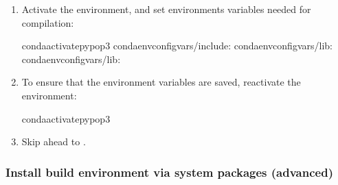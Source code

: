 \documentclass[letterpaper,10pt,english,openany,oneside]{sphinxmanual}
\begin{document}
\begin{enumerate}
\item {} 
\sphinxAtStartPar
Activate the environment, and set environments variables needed for
compilation:

\begin{sphinxVerbatim}[commandchars=\\\{\}]
condaactivatepypop3
condaenvconfigvars/include:
condaenvconfigvars/lib:
condaenvconfigvars/lib:
\end{sphinxVerbatim}

\item {} 
\sphinxAtStartPar
To ensure that the environment variables are saved, reactivate the
environment:

\begin{sphinxVerbatim}[commandchars=\\\{\}]
condaactivatepypop3
\end{sphinxVerbatim}

\item {} 
\sphinxAtStartPar
Skip ahead to {\hyperref[\detokenize{docs/guide-chapter-contributing:build-pypop}]{}}.

\end{enumerate}


\subsubsection{Install build environment via system packages (advanced)}
\label{\detokenize{docs/guide-chapter-contributing:install-build-environment-via-system-packages-advanced}}
\end{document}
